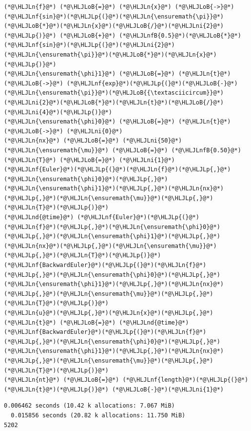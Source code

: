 \documentclass[12pt,a4paper]{article}
\newcommand{\HLJLn}[1]{#1}
\newcommand{\HLJLnd}[1]{\textcolor[RGB]{214,102,97}{#1}}
\newcommand{\HLJLnf}[1]{\textcolor[RGB]{66,102,213}{#1}}
\newcommand{\HLJLnfB}[1]{\textcolor[RGB]{59,151,46}{#1}}
\newcommand{\HLJLni}[1]{\textcolor[RGB]{59,151,46}{#1}}
\newcommand{\HLJLoB}[1]{\textcolor[RGB]{102,102,102}{\textbf{#1}}}
\newcommand{\HLJLp}[1]{#1}
\begin{document}
\begin{lstlisting}
(*@\HLJLn{f}@*) (*@\HLJLoB{=}@*) (*@\HLJLn{x}@*) (*@\HLJLoB{->}@*) (*@\HLJLnf{sin}@*)(*@\HLJLp{(}@*)(*@\HLJLn{\ensuremath{\pi}}@*)(*@\HLJLoB{*}@*)(*@\HLJLn{x}@*)(*@\HLJLoB{/}@*)(*@\HLJLni{2}@*)(*@\HLJLp{)}@*) (*@\HLJLoB{+}@*) (*@\HLJLnfB{0.5}@*)(*@\HLJLoB{*}@*)(*@\HLJLnf{sin}@*)(*@\HLJLp{(}@*)(*@\HLJLni{2}@*)(*@\HLJLn{\ensuremath{\pi}}@*)(*@\HLJLoB{*}@*)(*@\HLJLn{x}@*)(*@\HLJLp{)}@*)
(*@\HLJLn{\ensuremath{\phi}1}@*) (*@\HLJLoB{=}@*) (*@\HLJLn{t}@*) (*@\HLJLoB{->}@*) (*@\HLJLnf{exp}@*)(*@\HLJLp{(}@*)(*@\HLJLoB{-}@*)(*@\HLJLn{\ensuremath{\pi}}@*)(*@\HLJLoB{{\textasciicircum}}@*)(*@\HLJLni{2}@*)(*@\HLJLoB{*}@*)(*@\HLJLn{t}@*)(*@\HLJLoB{/}@*)(*@\HLJLni{4}@*)(*@\HLJLp{)}@*)
(*@\HLJLn{\ensuremath{\phi}0}@*) (*@\HLJLoB{=}@*) (*@\HLJLn{t}@*) (*@\HLJLoB{->}@*) (*@\HLJLni{0}@*)
(*@\HLJLn{nx}@*) (*@\HLJLoB{=}@*) (*@\HLJLni{50}@*)
(*@\HLJLn{\ensuremath{\mu}}@*) (*@\HLJLoB{=}@*) (*@\HLJLnfB{0.50}@*)
(*@\HLJLn{T}@*) (*@\HLJLoB{=}@*) (*@\HLJLni{1}@*)
(*@\HLJLnf{Euler}@*)(*@\HLJLp{(}@*)(*@\HLJLn{f}@*)(*@\HLJLp{,}@*)(*@\HLJLn{\ensuremath{\phi}0}@*)(*@\HLJLp{,}@*)(*@\HLJLn{\ensuremath{\phi}1}@*)(*@\HLJLp{,}@*)(*@\HLJLn{nx}@*)(*@\HLJLp{,}@*)(*@\HLJLn{\ensuremath{\mu}}@*)(*@\HLJLp{,}@*)(*@\HLJLn{T}@*)(*@\HLJLp{)}@*)
(*@\HLJLnd{@time}@*) (*@\HLJLnf{Euler}@*)(*@\HLJLp{(}@*)(*@\HLJLn{f}@*)(*@\HLJLp{,}@*)(*@\HLJLn{\ensuremath{\phi}0}@*)(*@\HLJLp{,}@*)(*@\HLJLn{\ensuremath{\phi}1}@*)(*@\HLJLp{,}@*)(*@\HLJLn{nx}@*)(*@\HLJLp{,}@*)(*@\HLJLn{\ensuremath{\mu}}@*)(*@\HLJLp{,}@*)(*@\HLJLn{T}@*)(*@\HLJLp{)}@*)
(*@\HLJLnf{BackwardEuler}@*)(*@\HLJLp{(}@*)(*@\HLJLn{f}@*)(*@\HLJLp{,}@*)(*@\HLJLn{\ensuremath{\phi}0}@*)(*@\HLJLp{,}@*)(*@\HLJLn{\ensuremath{\phi}1}@*)(*@\HLJLp{,}@*)(*@\HLJLn{nx}@*)(*@\HLJLp{,}@*)(*@\HLJLn{\ensuremath{\mu}}@*)(*@\HLJLp{,}@*)(*@\HLJLn{T}@*)(*@\HLJLp{)}@*)
(*@\HLJLn{u}@*)(*@\HLJLp{,}@*)(*@\HLJLn{x}@*)(*@\HLJLp{,}@*)(*@\HLJLn{t}@*) (*@\HLJLoB{=}@*) (*@\HLJLnd{@time}@*) (*@\HLJLnf{BackwardEuler}@*)(*@\HLJLp{(}@*)(*@\HLJLn{f}@*)(*@\HLJLp{,}@*)(*@\HLJLn{\ensuremath{\phi}0}@*)(*@\HLJLp{,}@*)(*@\HLJLn{\ensuremath{\phi}1}@*)(*@\HLJLp{,}@*)(*@\HLJLn{nx}@*)(*@\HLJLp{,}@*)(*@\HLJLn{\ensuremath{\mu}}@*)(*@\HLJLp{,}@*)(*@\HLJLn{T}@*)(*@\HLJLp{)}@*)
(*@\HLJLn{nt}@*) (*@\HLJLoB{=}@*) (*@\HLJLnf{length}@*)(*@\HLJLp{(}@*)(*@\HLJLn{t}@*)(*@\HLJLp{)}@*) (*@\HLJLoB{-}@*)(*@\HLJLni{1}@*)
\end{lstlisting}

\begin{lstlisting}
0.006462 seconds (10.42 k allocations: 7.067 MiB)
  0.015856 seconds (20.82 k allocations: 11.750 MiB)
5202
\end{lstlisting}
\end{document}
